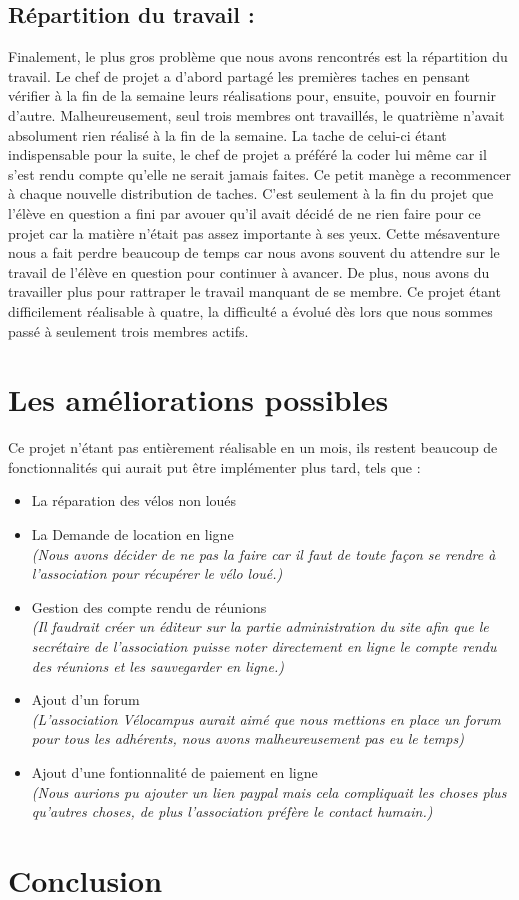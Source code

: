 \documentclass[11pt,a4paper,titlepage]{report}
\begin{document}
\section{Répartition du travail : }
Finalement, le plus gros problème que nous avons rencontrés est la répartition du travail. 
Le chef de projet a d'abord partagé les premières taches en pensant vérifier à la fin de la semaine leurs réalisations pour, ensuite, pouvoir en fournir d'autre. Malheureusement, seul trois membres ont travaillés, le quatrième n'avait absolument rien réalisé à la fin de la semaine. 
La tache de celui-ci étant indispensable pour la suite, le chef de projet a préféré la coder lui même car il s'est rendu compte qu'elle ne serait jamais faites.
Ce petit manège a recommencer à chaque nouvelle distribution de taches. C'est seulement à la fin du projet que l'élève en question a fini par avouer qu'il avait décidé de ne rien faire pour ce projet car la matière n'était pas assez importante à ses yeux. Cette mésaventure nous a fait perdre beaucoup de temps car nous avons souvent du attendre sur le travail de l'élève en question pour continuer à avancer. De plus, nous avons du travailler plus pour rattraper le travail manquant de se membre.
Ce projet étant difficilement réalisable à quatre, la difficulté a évolué dès lors que nous sommes passé à seulement trois membres actifs. 
\chapter{Les améliorations possibles}
Ce projet n'étant pas entièrement réalisable en un mois, ils restent beaucoup de fonctionnalités qui aurait put être implémenter plus tard, tels que : \\
\begin{itemize}
\item La réparation des vélos non loués 
\item La Demande de location en ligne \\
\textit{(Nous avons décider de ne pas la faire car il faut de toute façon se rendre à l'association pour récupérer le vélo loué.)}
\item Gestion des compte rendu de réunions \\ \textit{(Il faudrait créer un éditeur sur la partie administration du site afin que le secrétaire de l'association puisse noter directement en ligne le compte rendu des réunions et les sauvegarder en ligne.)} 
\item Ajout d'un forum \\
\textit{(L'association Vélocampus aurait aimé que nous mettions en place un forum pour tous les adhérents, nous avons malheureusement pas eu le temps)} 
\item Ajout d'une fontionnalité de paiement en ligne \\
\textit{(Nous aurions pu ajouter un lien paypal mais cela compliquait les choses plus qu'autres choses, de plus l'association préfère le contact humain.)} 
\end{itemize}
\chapter*{Conclusion}
\end{document}
